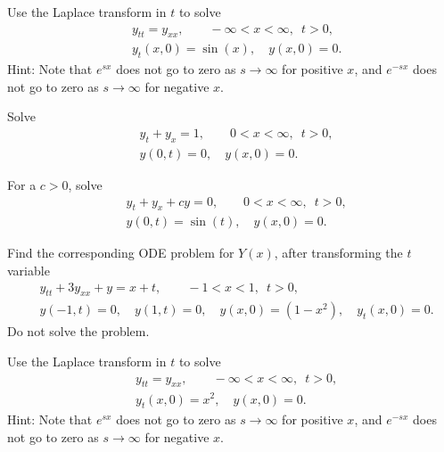 \begin{exercise}
Use the Laplace transform in $t$ to solve
\begin{align*}
& y_{tt} = y_{xx}, \qquad -\infty < x < \infty, \enspace t > 0,\\
& y_t(x,0) = \sin(x), \quad  y(x,0) = 0 .
\end{align*}
Hint: Note that
$e^{sx}$ does not go to zero as $s \to \infty$ for positive
$x$, and 
$e^{-sx}$ does not go to zero as $s \to \infty$ for negative $x$.
\end{exercise}

\setcounter{exercise}{100}

\begin{exercise}
Solve
\begin{align*}
& y_t + y_x = 1, \qquad 0 < x < \infty, \enspace t > 0,
\\
& y(0,t) = 0, \quad y(x,0) = 0 .
\end{align*}
\end{exercise}

\begin{exercise}
For a $c > 0$, solve
\begin{align*}
& y_t + y_x + c y = 0, \qquad 0 < x < \infty, \enspace t > 0,
\\
& y(0,t) = \sin(t), \quad y(x,0) = 0 .
\end{align*}
\end{exercise}

\begin{exercise}
Find the corresponding ODE problem for $Y(x)$, after transforming the $t$
variable
\begin{align*}
& y_{tt} + 3y_{xx} + y = x+t, \qquad -1 < x < 1, \enspace t > 0,
\\
& y(-1,t) = 0, \quad y(1,t) = 0, \quad y(x,0) = (1-x^2) , \quad y_t(x,0) = 0.
\end{align*}
Do not solve the problem.
\end{exercise}

\begin{exercise}
Use the Laplace transform in $t$ to solve
\begin{align*}
& y_{tt} = y_{xx}, \qquad -\infty < x < \infty, \enspace t > 0,\\
& y_t(x,0) = x^2, \quad  y(x,0) = 0 .
\end{align*}
Hint: Note that
$e^{sx}$ does not go to zero as $s \to \infty$ for positive
$x$, and 
$e^{-sx}$ does not go to zero as $s \to \infty$ for negative $x$.
\end{exercise}
